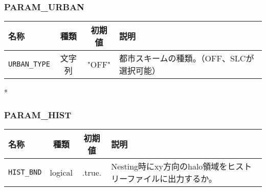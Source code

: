 \subsubsection{PARAM\_URBAN}
\begin{tabularx}{150mm}{|l|c|c|X|} \hline
 \rowcolor[gray]{0.9} 名称 & 種類 & 初期値 & 説明 \\ \hline
 \verb|URBAN_TYPE| & 文字列 & "OFF" & 都市スキームの種類。（OFF、SLCが選択可能）\\ \hline
\end{tabularx}

*
\subsubsection{PARAM\_HIST}
\begin{tabularx}{150mm}{|l|c|c|X|} \hline
 \rowcolor[gray]{0.9} 名称 & 種類 & 初期値 & 説明 \\ \hline
 \verb|HIST_BND| & logical & .true. & Nesting時にxy方向のhalo領域をヒストリーファイルに出力するか。 \\ \hline
\end{tabularx}


